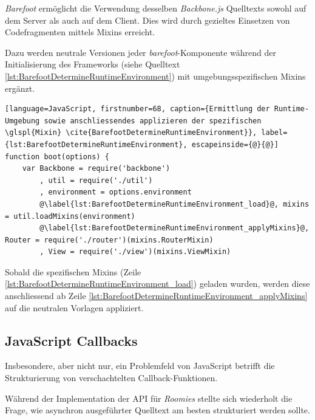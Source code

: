 \emph{Barefoot} \cite{Barefoot} ermöglicht die Verwendung desselben \emph{Backbone.js} Quelltexts sowohl auf dem Server als auch auf dem Client. Dies wird durch gezieltes Einsetzen von Codefragmenten mittels \gls{Mixin}s erreicht.

Dazu werden neutrale Versionen jeder \emph{barefoot}-Komponente während der Initialisierung des Frameworks (siehe Quelltext \ref{lst:BarefootDetermineRuntimeEnvironment}) mit umgebungsspezifischen Mixins ergänzt.

\begin{lstlisting}[language=JavaScript, firstnumber=68, caption={Ermittlung der Runtime-Umgebung sowie anschliessendes applizieren der spezifischen \glspl{Mixin} \cite{BarefootDetermineRuntimeEnvironment}}, label={lst:BarefootDetermineRuntimeEnvironment}, escapeinside={@}{@}]
function boot(options) {
	var Backbone = require('backbone')
		, util = require('./util')
		, environment = options.environment
		@\label{lst:BarefootDetermineRuntimeEnvironment_load}@, mixins = util.loadMixins(environment)
		@\label{lst:BarefootDetermineRuntimeEnvironment_applyMixins}@, Router = require('./router')(mixins.RouterMixin)
		, View = require('./view')(mixins.ViewMixin)
\end{lstlisting}

Sobald die spezifischen \gls{Mixin}s (Zeile \ref{lst:BarefootDetermineRuntimeEnvironment_load}) geladen wurden, werden diese anschliessend ab Zeile \ref{lst:BarefootDetermineRuntimeEnvironment_applyMixins} auf die neutralen Vorlagen appliziert.



\subsection{JavaScript Callbacks}
Insbesondere, aber nicht nur, ein Problemfeld von JavaScript betrifft die Strukturierung von verschachtelten Callback-Funktionen.

Während der Implementation der API für \emph{Roomies} stellte sich wiederholt die Frage, wie asynchron ausgeführter Quelltext am besten strukturiert werden sollte.

